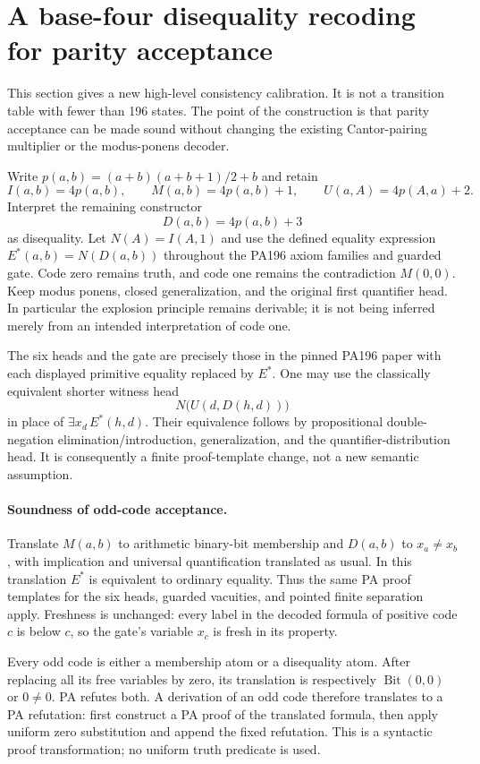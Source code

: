 \section{A base-four disequality recoding for parity acceptance}
\label{sec:disequality-parity}

This section gives a new high-level consistency calibration. It is not a
transition table with fewer than 196 states. The point of the construction
is that parity acceptance can be made sound without changing the existing
Cantor-pairing multiplier or the modus-ponens decoder.

Write $p(a,b)=(a+b)(a+b+1)/2+b$ and retain
\[
 I(a,b)=4p(a,b),\qquad M(a,b)=4p(a,b)+1,\qquad
 U(a,A)=4p(A,a)+2.
\]
Interpret the remaining constructor
\[
 D(a,b)=4p(a,b)+3
\]
as disequality. Let $N(A)=I(A,1)$ and use the defined equality expression
$E^*(a,b)=N(D(a,b))$ throughout the PA196 axiom families and guarded gate.
Code zero remains truth, and code one remains the contradiction $M(0,0)$.
Keep modus ponens, closed generalization, and the original first quantifier
head. In particular the explosion principle remains derivable; it is not
being inferred merely from an intended interpretation of code one.

The six heads and the gate are precisely those in the pinned PA196 paper
with each displayed primitive equality replaced by $E^*$. One may use the
classically equivalent shorter witness head
\[
 N\bigl(U(d,D(h,d))\bigr)
\]
in place of $\exists x_d\,E^*(h,d)$. Their equivalence follows by
propositional double-negation elimination/introduction, generalization,
and the quantifier-distribution head. It is consequently a finite
proof-template change, not a new semantic assumption.

\paragraph{Soundness of odd-code acceptance.}
Translate $M(a,b)$ to arithmetic binary-bit membership and $D(a,b)$ to
$x_a\ne x_b$, with implication and universal quantification translated
as usual. In this translation $E^*$ is equivalent to ordinary equality.
Thus the same PA proof templates for the six heads, guarded vacuities,
and pointed finite separation apply. Freshness is unchanged: every label
in the decoded formula of positive code $c$ is below $c$, so the gate's
variable $x_c$ is fresh in its property.

Every odd code is either a membership atom or a disequality atom.
After replacing all its free variables by zero, its translation is
respectively $\operatorname{Bit}(0,0)$ or $0\ne0$. PA refutes both.
A derivation of an odd code therefore translates to a PA refutation:
first construct a PA proof of the translated formula, then apply uniform
zero substitution and append the fixed refutation. This is a syntactic
proof transformation; no uniform truth predicate is used.

